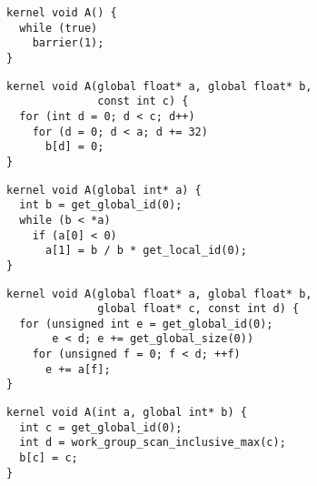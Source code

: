 \newsavebox{\IntelPostDominanceFrontier}
\begin{lrbox}{\IntelPostDominanceFrontier}
  \begin{minipage}{\textwidth}
    \begin{verbatim}
kernel void A() {
  while (true)
    barrier(1);
}
    \end{verbatim}
  \end{minipage}
\end{lrbox}

\newsavebox{\SimplifyTheCFGPass}
\begin{lrbox}{\SimplifyTheCFGPass}
  \begin{minipage}{\textwidth}
    \begin{verbatim}
kernel void A(global float* a, global float* b,
              const int c) {
  for (int d = 0; d < c; d++)
    for (d = 0; d < a; d += 32)
      b[d] = 0;
}
    \end{verbatim}
  \end{minipage}
\end{lrbox}

\newsavebox{\IntelPredicator}
\begin{lrbox}{\IntelPredicator}
  \begin{minipage}{\textwidth}
    \begin{verbatim}
kernel void A(global int* a) {
  int b = get_global_id(0);
  while (b < *a)
    if (a[0] < 0)
      a[1] = b / b * get_local_id(0);
}
    \end{verbatim}
  \end{minipage}
\end{lrbox}

\newsavebox{\IntelCombineRedundant}
\begin{lrbox}{\IntelCombineRedundant}
  \begin{minipage}{\textwidth}
    \begin{verbatim}
kernel void A(global float* a, global float* b,
              global float* c, const int d) {
  for (unsigned int e = get_global_id(0);
       e < d; e += get_global_size(0))
    for (unsigned f = 0; f < d; ++f)
      e += a[f];
}
    \end{verbatim}
  \end{minipage}
\end{lrbox}

\newsavebox{\IntelPrepareKernelArgs}
\begin{lrbox}{\IntelPrepareKernelArgs}
  \begin{minipage}{\textwidth}
    \begin{verbatim}
kernel void A(int a, global int* b) {
  int c = get_global_id(0);
  int d = work_group_scan_inclusive_max(c);
  b[c] = c;
}
    \end{verbatim}
  \end{minipage}
\end{lrbox}

